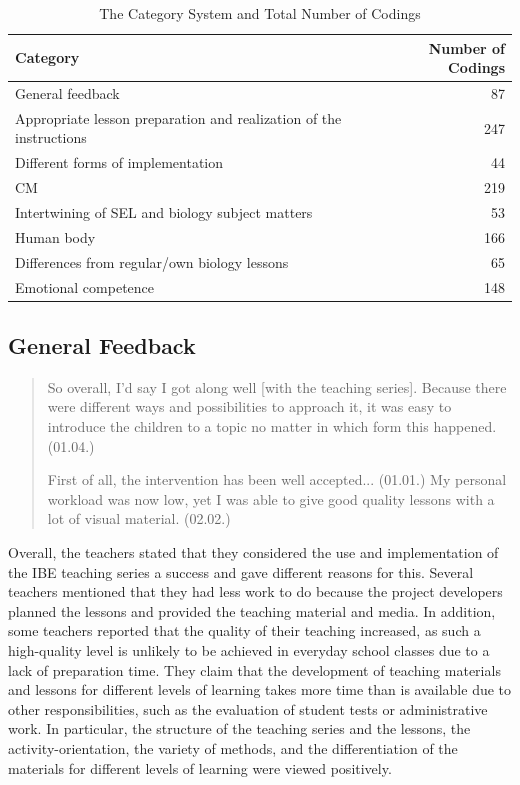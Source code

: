 \documentclass[11.5pt]{sig-alternate} %
\begin{document}
\begin{large}
\begin{table}[ht]
\caption{The Category System and Total Number of Codings}
\begin{tabular}{lr}
\hline
Category & Number of Codings \\ \hline
General feedback & 87 \\
Appropriate lesson preparation and realization of the instructions & 247 \\
Different forms of implementation & 44 \\
CM & 219 \\
Intertwining of SEL and biology subject matters & 53 \\
Human body & 166 \\
Differences from regular/own biology lessons & 65 \\
Emotional competence & 148 \\ \hline
\end{tabular}
\end{table}

\subsection*{General Feedback}

\begin{quote}
    So overall, I’d say I got along well [with the teaching series]. Because there were different ways and possibilities to approach it, it was easy to introduce the children to a topic no matter in which form this happened. (01.04.)

    First of all, the intervention has been well accepted... (01.01.) My personal workload was now low, yet I was able to give good quality lessons with a lot of visual material. (02.02.)
\end{quote}

Overall, the teachers stated that they considered the use and implementation of the IBE teaching series a success and gave different reasons for this. Several teachers mentioned that they had less work to do because the project developers planned the lessons and provided the teaching material and media. In addition, some teachers reported that the quality of their teaching increased, as such a high-quality level is unlikely to be achieved in everyday school classes due to a lack of preparation time. They claim that the development of teaching materials and lessons for different levels of learning takes more time than is available due to other responsibilities, such as the evaluation of student tests or administrative work. In particular, the structure of the teaching series and the lessons, the activity-orientation, the variety of methods, and the differentiation of the materials for different levels of learning were viewed positively. 


\end{large}
\end{document}
